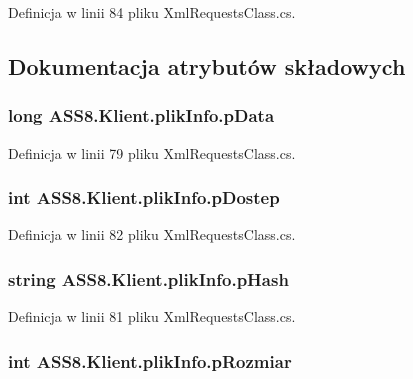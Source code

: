 Definicja w linii 84 pliku XmlRequestsClass.cs.

\subsection{Dokumentacja atrybutów składowych}
\hypertarget{a00018_c36ffedceffa046ba1bf7e315a6905b8}{
\subsubsection[{pData}]{\setlength{\rightskip}{0pt plus 5cm}long {\bf ASS8.Klient.plikInfo.pData}}}
\label{d1/d2b/a00018_c36ffedceffa046ba1bf7e315a6905b8}




Definicja w linii 79 pliku XmlRequestsClass.cs.\hypertarget{a00018_72c17cbc674bf8c89317ac46d02dd758}{
\subsubsection[{pDostep}]{\setlength{\rightskip}{0pt plus 5cm}int {\bf ASS8.Klient.plikInfo.pDostep}}}
\label{d1/d2b/a00018_72c17cbc674bf8c89317ac46d02dd758}




Definicja w linii 82 pliku XmlRequestsClass.cs.\hypertarget{a00018_340847ed2b521b02d46a77a2dbf71201}{
\subsubsection[{pHash}]{\setlength{\rightskip}{0pt plus 5cm}string {\bf ASS8.Klient.plikInfo.pHash}}}
\label{d1/d2b/a00018_340847ed2b521b02d46a77a2dbf71201}




Definicja w linii 81 pliku XmlRequestsClass.cs.\hypertarget{a00018_e808a0115a1a6ff695d46a2605827efc}{
\subsubsection[{pRozmiar}]{\setlength{\rightskip}{0pt plus 5cm}int {\bf ASS8.Klient.plikInfo.pRozmiar}}}
\label{d1/d2b/a00018_e808a0115a1a6ff695d46a2605827efc}




